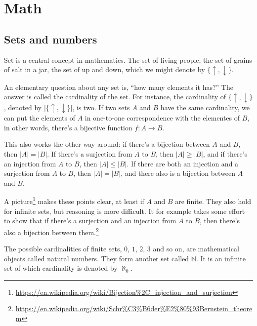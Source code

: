 \documentclass[11pt,%
]{memoir}
\newcommand{\NN}{\mathbb{N}}
\newcommand{\RR}{\mathbb{R}}
\newcommand{\CC}{\mathbb{C}}
\newcommand{\ZZ}{\mathbb{Z}}
\newcommand{\QQ}{\mathbb{Q}}
\begin{document}
\chapter{Math}


\section{Sets and numbers}

Set is a central concept in mathematics. The set of living people, the set of grains of salt in a jar, the set of up and down, which we might denote by \(\lbrace\uparrow,\downarrow\rbrace\). %

An elementary question about any set is, ``how many elements it has?'' The answer is called the cardinality of the set. For instance, the cardinality of \(\lbrace\uparrow,\downarrow\rbrace\), denoted by \(|\lbrace\uparrow,\downarrow\rbrace|\), is two. If two sets \(A\) and \(B\) have the same cardinality, we can put the elements of \(A\) in one-to-one correspondence with the elementes of \(B\), in other words, there's a bijective function \(f:A\rightarrow B\). %

This also works the other way around: if there's a bijection between \(A\) and \(B\), then \(|A|=|B|\). If there's a surjection from \(A\) to \(B\), then \(|A|\geq|B|\), and if there's an injection from \(A\) to \(B\), then \(|A|\leq|B|\). If there are both an injection and a surjection from \(A\) to \(B\), then \(|A|=|B|\), and there also is a bijection between \(A\) and \(B\).

A picture\footnote{\url{https://en.wikipedia.org/wiki/Bijection\%2C_injection_and_surjection}} makes these points clear, at least if \(A\) and \(B\) are finite. They also hold for infinite sets, but reasoning is more difficult. It for example takes some effort to show that if there's a surjection and an injection from \(A\) to \(B\), then there's also a bijection between them.\footnote{\url{https://en.wikipedia.org/wiki/Schr\%C3\%B6der\%E2\%80\%93Bernstein_theorem}}

The possible cardinalities of finite sets, \(0\), \(1\), \(2\), \(3\) and so on, are mathematical objects called natural numbers. They form another set called \(\NN\). It is an infinite set of which cardinality is denoted by \(\aleph_0\).
\end{document}

